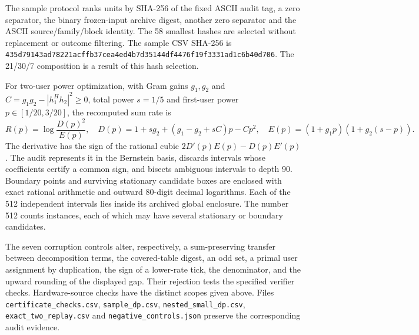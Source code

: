\documentclass[10pt,letterpaper]{article}
\begin{document}
The sample protocol ranks units by SHA-256 of the fixed ASCII audit tag,
a zero separator, the binary frozen-input archive digest, another zero separator and
the ASCII source/family/block identity. The 58 smallest hashes are selected
without replacement or outcome filtering. The sample CSV SHA-256 is
\texttt{435d79143ad78221acffb37cea4ed4b7d}\allowbreak\texttt{35144df4476f19f3331ad1c6b40d706}.
The 21/30/7 composition is a result of this hash selection.

For two-user power optimization, with Gram gains $g_1,g_2$ and
$C=g_1g_2-|h_1^Hh_2|^2\geq0$, total power $s=1/5$ and first-user power
$p\in[1/20,3/20]$, the recomputed sum rate is
\begin{equation}
 R(p)=\log\frac{D(p)^2}{E(p)},\quad
 D(p)=1+sg_2+(g_1-g_2+sC)p-Cp^2,\quad
 E(p)=(1+g_1p)(1+g_2(s-p)).
\end{equation}
The derivative has the sign of the rational cubic
$2D'(p)E(p)-D(p)E'(p)$. The audit represents it in the Bernstein basis,
discards intervals whose coefficients certify a common sign, and bisects
ambiguous intervals to depth 90. Boundary points and surviving stationary
candidate boxes are enclosed with exact rational arithmetic and outward
80-digit decimal logarithms. Each of the 512 independent intervals lies
inside its archived global enclosure. The number 512 counts instances,
each of which may have several stationary or boundary candidates.

The seven corruption controls alter, respectively, a sum-preserving transfer
between decomposition terms, the covered-table digest, an odd set, a primal user
assignment by duplication, the sign of a lower-rate tick, the denominator,
and the upward rounding of the displayed gap. Their rejection tests the
specified verifier checks. Hardware-source checks have the distinct scopes
given above. Files \texttt{certificate\_checks.csv}, \texttt{sample\_dp.csv},
\texttt{nested\_small\_dp.csv}, \texttt{exact\_two\_replay.csv} and
\texttt{negative\_controls.json} preserve the corresponding audit evidence.
\end{document}
